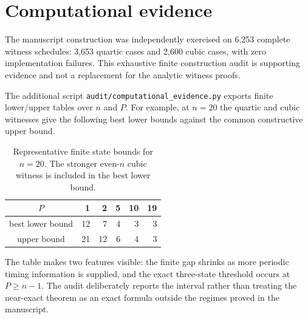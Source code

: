 \section{Computational evidence}\label{sec:computational-evidence}

The manuscript construction was independently exercised on 6,253 complete witness schedules: 3,653 quartic cases and 2,600 cubic cases, with zero implementation failures.  This exhaustive finite construction audit is supporting evidence and not a replacement for the analytic witness proofs.

The additional script \texttt{audit/computational\_evidence.py} exports finite lower/upper tables over $n$ and $P$.  For example, at $n=20$ the quartic and cubic witnesses give the following best lower bounds against the common constructive upper bound.

\begin{table}[ht]
\centering
\begin{tabular}{c|rrrrr}
$P$ & 1 & 2 & 5 & 10 & 19 \\
\hline
best lower bound & 12 & 7 & 4 & 3 & 3 \\
upper bound & 21 & 12 & 6 & 4 & 3
\end{tabular}
\caption{Representative finite state bounds for $n=20$.  The stronger even-$n$ cubic witness is included in the best lower bound.}
\label{tab:dynamic-regular-finite}
\end{table}

The table makes two features visible: the finite gap shrinks as more periodic timing information is supplied, and the exact three-state threshold occurs at $P\ge n-1$.  The audit deliberately reports the interval rather than treating the near-exact theorem as an exact formula outside the regimes proved in the manuscript.
